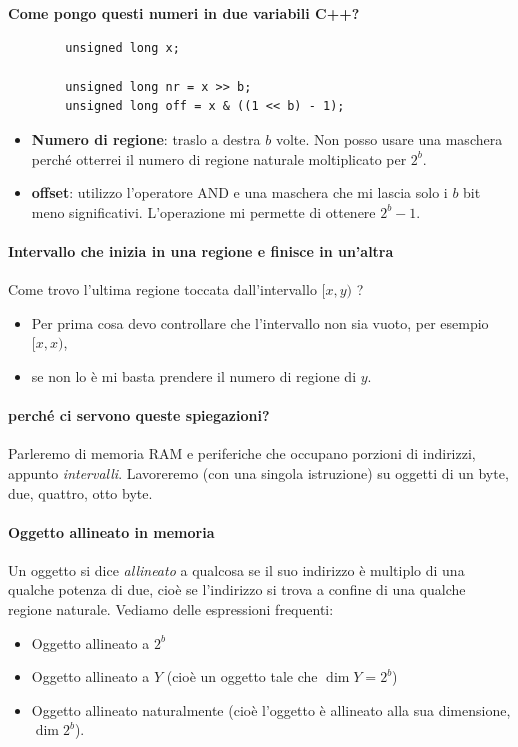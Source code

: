 \begin{framed}
	\noindent \textbf{Come pongo questi numeri in due variabili C++?}
	\begin{verbatim}
		unsigned long x;
		
		unsigned long nr = x >> b;
		unsigned long off = x & ((1 << b) - 1);
	\end{verbatim}
	\begin{itemize}
		\item \textbf{Numero di regione}: traslo a destra $b$ volte. Non posso usare una maschera perché otterrei il numero di regione naturale moltiplicato per $2^b$.
		\item \textbf{offset}: utilizzo l'operatore AND e una maschera che mi lascia solo i $b$ bit meno significativi. L'operazione mi permette di ottenere $2^b-1$.
	\end{itemize}
\end{framed}
\paragraph{Intervallo che inizia in una regione e finisce in un'altra} Come trovo l'ultima regione toccata dall'intervallo $[x,y)$ ? 
\begin{itemize}
	\item Per prima cosa devo controllare che l'intervallo non sia vuoto, per esempio $[x,x)$, 
	\item se non lo è mi basta prendere il numero di regione di $y$.
\end{itemize}
\paragraph{perché ci servono queste spiegazioni?} Parleremo di memoria RAM e periferiche che occupano porzioni di indirizzi, appunto \emph{intervalli}. Lavoreremo (con una singola istruzione) su oggetti di un byte, due, quattro, otto byte.

\paragraph{Oggetto allineato in memoria} Un oggetto si dice \emph{allineato} a qualcosa se il suo indirizzo è multiplo di una qualche potenza di due, cioè se l'indirizzo si trova a confine di una qualche regione naturale. Vediamo delle espressioni frequenti:
\begin{itemize}
	\item Oggetto allineato a $2^b$
	\item Oggetto allineato a $Y$ (cioè un oggetto tale che $\dim Y = 2^b$)
	\item Oggetto allineato naturalmente (cioè l'oggetto è allineato alla sua dimensione, $\dim 2^b$).
\end{itemize}